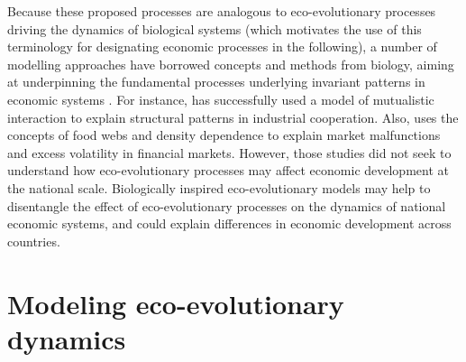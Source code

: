 % 
% 
Because these proposed processes are analogous to eco-evolutionary processes driving the dynamics of biological systems (which motivates the use of this terminology for designating economic processes in the following), a number of modelling approaches have borrowed concepts and methods from biology, aiming at underpinning the fundamental processes underlying invariant patterns in economic systems \citep{Tacchella2018,Saavedra2009a,Scholl2020,Zhang2018,Modis1997,Saavedra2014,Farmer1999,Michalakelis2011,Marasco2016,Gatabazi2019,Cauwels56,Applegate2021,Suweis2015}. 
% 
For instance, \citep{Saavedra2009a} has successfully used a model of mutualistic interaction to explain structural patterns in industrial cooperation.
% 
Also, \citep{Scholl2020} uses the concepts of food webs and density dependence to explain market malfunctions and excess volatility in financial markets.
% 
However, those studies did not seek to understand how eco-evolutionary processes may affect economic development at the national scale.
% 
Biologically inspired eco-evolutionary models may help to disentangle the effect of eco-evolutionary processes on the dynamics of national economic systems, and could explain differences in economic development across countries.

\section{Modeling eco-evolutionary dynamics}

